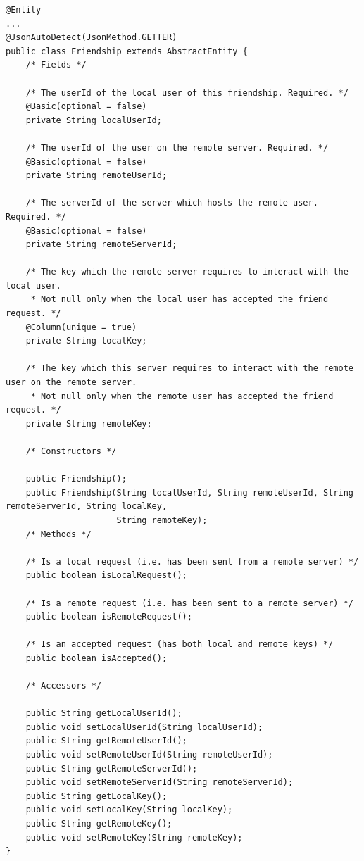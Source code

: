 \begin{small}\begin{verbatim}
@Entity
...
@JsonAutoDetect(JsonMethod.GETTER)
public class Friendship extends AbstractEntity {
    /* Fields */
    
    /* The userId of the local user of this friendship. Required. */
    @Basic(optional = false)
    private String localUserId;
    
    /* The userId of the user on the remote server. Required. */
    @Basic(optional = false)
    private String remoteUserId;
    
    /* The serverId of the server which hosts the remote user. Required. */
    @Basic(optional = false)
    private String remoteServerId;
    
    /* The key which the remote server requires to interact with the local user.
     * Not null only when the local user has accepted the friend request. */
    @Column(unique = true)
    private String localKey;
    
    /* The key which this server requires to interact with the remote user on the remote server.
     * Not null only when the remote user has accepted the friend request. */
    private String remoteKey;
    
    /* Constructors */
    
    public Friendship();
    public Friendship(String localUserId, String remoteUserId, String remoteServerId, String localKey,
                      String remoteKey);
    /* Methods */
    
    /* Is a local request (i.e. has been sent from a remote server) */
    public boolean isLocalRequest();
    
    /* Is a remote request (i.e. has been sent to a remote server) */
    public boolean isRemoteRequest();
    
    /* Is an accepted request (has both local and remote keys) */
    public boolean isAccepted();
    
    /* Accessors */

    public String getLocalUserId();
    public void setLocalUserId(String localUserId);
    public String getRemoteUserId();
    public void setRemoteUserId(String remoteUserId);
    public String getRemoteServerId();
    public void setRemoteServerId(String remoteServerId);
    public String getLocalKey();
    public void setLocalKey(String localKey);
    public String getRemoteKey();
    public void setRemoteKey(String remoteKey);   
}
\end{verbatim}\end{small}

